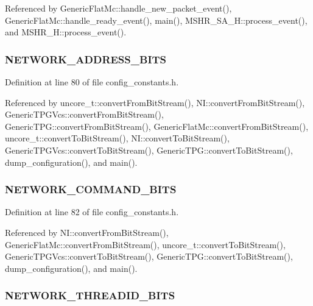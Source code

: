 Referenced by GenericFlatMc::handle\_\-new\_\-packet\_\-event(), GenericFlatMc::handle\_\-ready\_\-event(), main(), MSHR\_\-SA\_\-H::process\_\-event(), and MSHR\_\-H::process\_\-event().
\subsubsection[{NETWORK\_\-ADDRESS\_\-BITS}]{ {\bf NETWORK\_\-ADDRESS\_\-BITS}}\label{mc__constants_8h_bee72fa7d3b3eb5cc82e7dc8d6db8222}




Definition at line 80 of file config\_\-constants.h.

Referenced by uncore\_\-t::convertFromBitStream(), NI::convertFromBitStream(), GenericTPGVcs::convertFromBitStream(), GenericTPG::convertFromBitStream(), GenericFlatMc::convertFromBitStream(), uncore\_\-t::convertToBitStream(), NI::convertToBitStream(), GenericTPGVcs::convertToBitStream(), GenericTPG::convertToBitStream(), dump\_\-configuration(), and main().
\subsubsection[{NETWORK\_\-COMMAND\_\-BITS}]{ {\bf NETWORK\_\-COMMAND\_\-BITS}}\label{mc__constants_8h_dc7fe0dd54cfc2c2acf6e737e18116a1}




Definition at line 82 of file config\_\-constants.h.

Referenced by NI::convertFromBitStream(), GenericFlatMc::convertFromBitStream(), uncore\_\-t::convertToBitStream(), GenericTPGVcs::convertToBitStream(), GenericTPG::convertToBitStream(), dump\_\-configuration(), and main().
\subsubsection[{NETWORK\_\-THREADID\_\-BITS}]{ {\bf NETWORK\_\-THREADID\_\-BITS}}\label{mc__constants_8h_582a80c814dfe22c0a7ad5dda77d2033}




